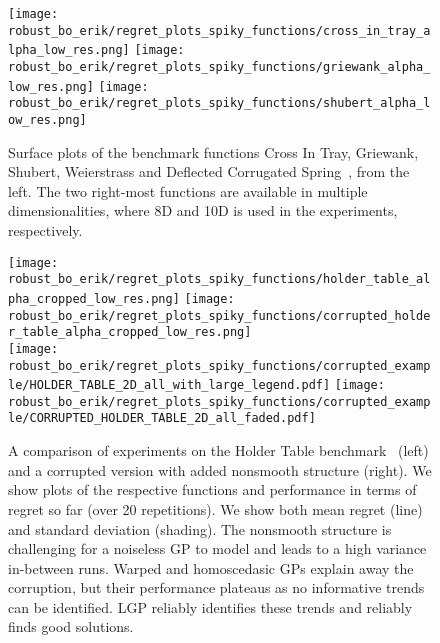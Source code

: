 \begin{figure}[t]
    \centering
    \texttt{[image: robust\_bo\_erik/regret\_plots\_spiky\_functions/cross\_in\_tray\_alpha\_low\_res.png]}
    \texttt{[image: robust\_bo\_erik/regret\_plots\_spiky\_functions/griewank\_alpha\_low\_res.png]}
    \texttt{[image: robust\_bo\_erik/regret\_plots\_spiky\_functions/shubert\_alpha\_low\_res.png]}
    \caption{
    Surface plots of the benchmark functions Cross In Tray, Griewank, Shubert, Weierstrass and Deflected Corrugated Spring~\parencite{mccourt_optimization_2016}, from the left.
    The two right-most functions are available in multiple dimensionalities, where 8D and 10D is used in the experiments, respectively.
    \label{fig:bayesian_optimization:functions_plots}
    }
\end{figure}
\begin{figure}[t]
    \centering

    \texttt{[image: robust\_bo\_erik/regret\_plots\_spiky\_functions/holder\_table\_alpha\_cropped\_low\_res.png]}
    \texttt{[image: robust\_bo\_erik/regret\_plots\_spiky\_functions/corrupted\_holder\_table\_alpha\_cropped\_low\_res.png]}\\
    \vspace{-2cm}
    \texttt{[image: robust\_bo\_erik/regret\_plots\_spiky\_functions/corrupted\_example/HOLDER\_TABLE\_2D\_all\_with\_large\_legend.pdf]}
    \texttt{[image: robust\_bo\_erik/regret\_plots\_spiky\_functions/corrupted\_example/CORRUPTED\_HOLDER\_TABLE\_2D\_all\_faded.pdf]}
    \caption{
    A comparison of experiments on the Holder Table benchmark~\parencite{mccourt_optimization_2016} (left) and a corrupted version with added nonsmooth structure (right).
    We show plots of the respective functions and performance in terms of regret so far (over 20 repetitions).
    We show both mean regret (line) and standard deviation (shading).
    The nonsmooth structure is challenging for a noiseless GP to model and leads to a high variance in-between runs.
    Warped and homoscedasic GPs explain away the corruption, but their performance plateaus as no informative trends can be identified.
    LGP reliably identifies these trends and reliably finds good solutions.
    }

    \label{fig:bayesian_optimization:corrupted_holder}
\end{figure}

